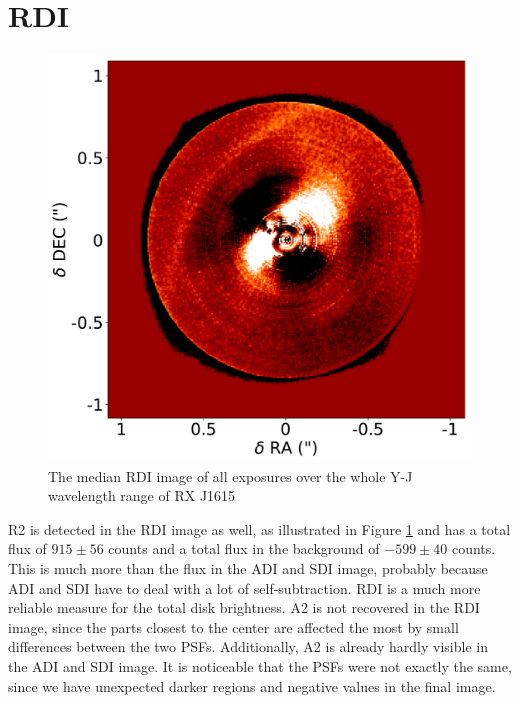 \documentclass[twoside,single,12pt]{lion-msc}
\begin{document}
\section{RDI}
\begin{figure}
\vspace{-6mm}
\centering
\includegraphics[width=1.02\linewidth]{RDI_tot_smallimcon}
\caption{The median RDI image of all exposures over the whole Y-J wavelength range of RX J1615}
\label{fig:RDI_tot}
\vspace{-4mm}
\end{figure}

R2 is detected in the RDI image as well, as illustrated in Figure \ref{fig:RDI_tot} and has a total flux of $915 \pm 56$ counts and a total flux in the background of $-599 \pm 40$ counts. This is much more than the flux in the ADI and SDI image, probably because ADI and SDI have to deal with a lot of self-subtraction. RDI is a much more reliable measure for the total disk brightness. A2 is not recovered in the RDI image, since the parts closest to the center are affected the most by small differences between the two PSFs. Additionally, A2 is  already hardly visible in the ADI and SDI image. It is noticeable that the PSFs were not exactly the same, since we have unexpected darker regions and negative values in the final image.
\bigskip
\end{document}
